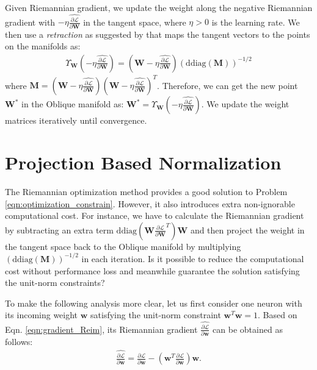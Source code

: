 \documentclass[twocolumn]{article}
\begin{document}
Given Riemannian gradient, we update the weight along the negative Riemannian gradient with $-\eta \widehat{\frac{\partial \mathcal{L} }{\partial \mathbf{W}}}$ in the tangent space, where $\eta>0$ is the learning rate. We then use a \emph{retraction} as suggested by \cite{2006_ICASSP_Absil} that maps the tangent vectors to the points on the manifolds as:
\begin{eqnarray}
\label{eqn:retract}
\Upsilon_{\mathbf{W}}(-\eta \widehat{\frac{\partial \mathcal{L} }{\partial \mathbf{W}}})
=(\mathbf{W}-\eta \widehat{\frac{\partial \mathcal{L} }{\partial \mathbf{W}}} )
(\text{ddiag}(\mathbf{M}))^{-1/2}
\end{eqnarray}
where $\mathbf{M}=(\mathbf{W}-\eta \widehat{\frac{\partial \mathcal{L} }{\partial \mathbf{W}}})
(\mathbf{W}-\eta \widehat{\frac{\partial \mathcal{L} }{\partial \mathbf{W}}})^T$. Therefore, we can get the new point $\mathbf{W}^*$ in the Oblique manifold as: $\mathbf{W}^*=\Upsilon_{\mathbf{W}}(-\eta \widehat{\frac{\partial \mathcal{L} }{\partial \mathbf{W}}})$. We update the weight matrices iteratively until convergence.

\section{Projection Based Normalization}
The Riemannian optimization method provides a good solution to Problem \ref{eqn:optimization_constrain}. However, it also introduces extra non-ignorable computational cost. For instance, we have to calculate the Riemannian gradient by subtracting an extra term $\text{ddiag}(\mathbf{W} \frac{\partial \mathcal{L} }{\partial \mathbf{W}}^T) \mathbf{W}$ and then project the weight in the tangent space back to the Oblique manifold by multiplying $(\text{ddiag}(\mathbf{M}))^{-1/2}$ in each iteration. Is it possible to reduce the computational cost without performance loss and meanwhile guarantee the solution satisfying the unit-norm constraints?

To make the following analysis more clear, let us first consider one neuron with its incoming weight $\mathbf{w}$ satisfying the unit-norm constraint $\mathbf{w}^T \mathbf{w}=1$. Based on Eqn. \ref{eqn:gradient_Reim}, its Riemannian gradient $\widehat{\frac{\partial \mathcal{L} }{\partial \mathbf{w}}}$ can be obtained as follows:
 \begin{eqnarray}
 \label{eqn:gradient_Riem_perUnit}
\widehat{\frac{\partial \mathcal{L} }{\partial \mathbf{w}}}=\frac{\partial \mathcal{L} }{\partial \mathbf{w}} - (\mathbf{w}^T \frac{\partial \mathcal{L} }{\partial \mathbf{w}}) \mathbf{w}.
\end{eqnarray}
\end{document}
